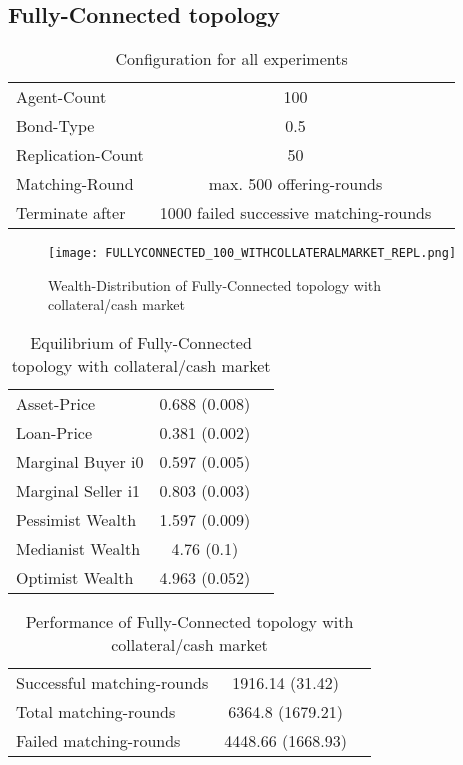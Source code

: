 \documentclass[Bachelorarbeit.tex]{subfiles}
\begin{document}
\subsection{Fully-Connected topology}
\begin{table}[H]
	\centering
	\caption{Configuration for all experiments}
	\begin{tabular} { l c r }
		\hline
		Agent-Count & 100 \\
		Bond-Type & 0.5 \\
		Replication-Count & 50 \\
		Matching-Round & max. 500 offering-rounds \\
		Terminate after & 1000 failed successive matching-rounds \\
		\hline
	\end{tabular}
\end{table}

\begin{figure}[H]
	\centering
  \texttt{[image: FULLYCONNECTED\_100\_WITHCOLLATERALMARKET\_REPL.png]}
	\caption{Wealth-Distribution of Fully-Connected topology with collateral/cash market}
	\label{fig:wealth_FULLYCONNECTED_100_WITHCOLLATERALMARKET_REPL}
\end{figure}

\begin{table}[H]
	\caption{Equilibrium of Fully-Connected topology with collateral/cash market}
	\centering
	\begin{tabular} { l c r }
		\hline
		Asset-Price & 0.688 (0.008) \\
		Loan-Price & 0.381 (0.002) \\
		Marginal Buyer i0 & 0.597 (0.005) \\
		Marginal Seller i1 & 0.803 (0.003) \\
		\hline
		Pessimist Wealth & 1.597 (0.009) \\
		Medianist Wealth & 4.76 (0.1) \\
		Optimist Wealth & 4.963 (0.052) \\
		\hline
	\end{tabular}
\end{table} 

\begin{table}[H]
	\caption{Performance of Fully-Connected topology with collateral/cash market}
	\centering
	\begin{tabular} { l c r }
		\hline
		Successful matching-rounds & 1916.14 (31.42) \\
		Total matching-rounds & 6364.8 (1679.21) \\
		Failed matching-rounds & 4448.66 (1668.93) \\
		\hline
	\end{tabular}
\end{table}
\end{document}
